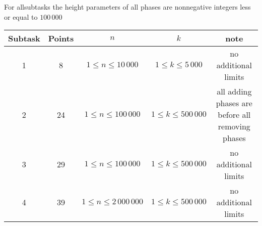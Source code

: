 For allsubtasks the height parameters of all phases are nonnegative integers less or equal to $100\,000$

\begin{center}
\renewcommand{\arraystretch}{1.5}
\begin{tabular}{ |c|c|c|c|c| }
\hline
Subtask & Points & $n$ & $k$ & note\\
\hline
1 & 8 & $1 \le n \le 10\,000$ & $1 \le k \le 5\,000$ & no additional limits \\
\hline
2 & 24 & $1 \le n \le 100\,000$ & $1 \le k \le 500\,000$ & all adding phases are before all
removing phases\\
\hline
3 & 29 & $1 \le n \le 100\,000$ & $1 \le k \le 500\,000$ & no additional limits\\
\hline
4 & 39 & $1 \le n \le 2\,000\,000$ & $1 \le k \le 500\,000$ & no additional limits\\
\hline
\end{tabular}
\end{center}